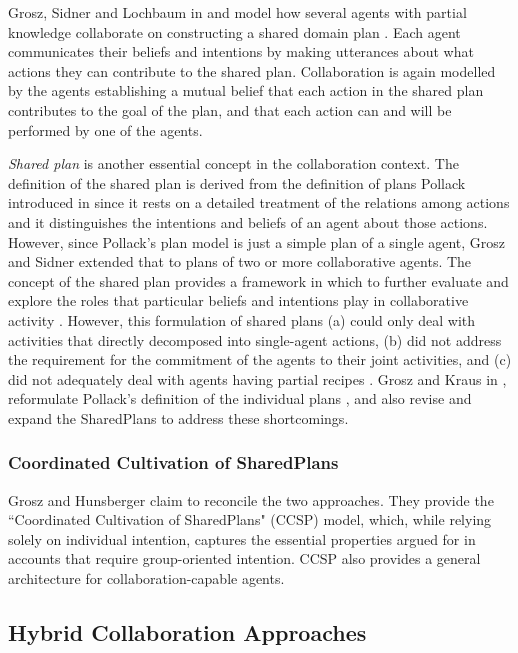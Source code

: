 \documentclass[11pt]{article}
\begin{document}
Grosz, Sidner and Lochbaum in \cite{grosz:plans-discourse} and
\cite{lochbaum:plan-models} model how several agents with partial knowledge
collaborate on constructing a shared domain plan . Each agent communicates their
beliefs and intentions by making utterances about what actions they can
contribute to the shared plan. Collaboration is again modelled by the agents
establishing a mutual belief that each action in the shared plan contributes to
the goal of the plan, and that each action can and will be performed by one of
the agents.

\textit{Shared plan} is another essential concept in the collaboration context.
The definition of the shared plan is derived from the definition of plans
Pollack introduced in \cite{pollack:plan-inference,
pollack:plan-mental-attitudes} since it rests on a detailed treatment of the
relations among actions and it distinguishes the intentions and beliefs of an
agent about those actions. However, since Pollack's plan model is just a simple
plan of a single agent, Grosz and Sidner extended that to plans of two or more
collaborative agents. The concept of the shared plan provides a framework in
which to further evaluate and explore the roles that particular beliefs and
intentions play in collaborative activity \cite{lochbaum:plan-models}. However,
this formulation of shared plans (a) could only deal with activities that
directly decomposed into single-agent actions, (b) did not address the
requirement for the commitment of the agents to their joint activities, and (c)
did not adequately deal with agents having partial recipes
\cite{grosz:collaboration}. Grosz and Kraus in \cite{grosz:collaboration},
reformulate Pollack's definition of the individual plans
\cite{pollack:plan-mental-attitudes}, and also revise and expand the SharedPlans
to address these shortcomings.

\subsubsection{Coordinated Cultivation of SharedPlans}

Grosz and Hunsberger \cite{grosz:ccsp} claim to reconcile the two approaches.
They provide the ``Coordinated Cultivation of SharedPlans" (CCSP) model, which,
while relying solely on individual intention, captures the essential properties
argued for in accounts that require group-oriented intention. CCSP also provides
a general architecture for collaboration-capable agents.

\subsection{Hybrid Collaboration Approaches}
\end{document}
